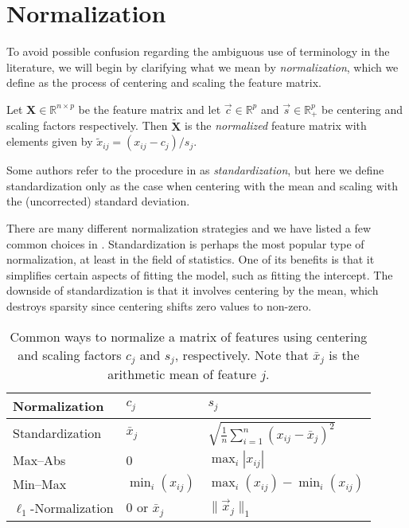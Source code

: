 \section{Normalization}
To avoid possible confusion regarding the ambiguous use of terminology in the literature,
we will begin by clarifying what we mean by \emph{normalization}, which we define as the
process of centering and scaling the feature matrix.

\begin{definition}[Normalization]
  \label{def:normalization}
  Let \(\bm{X} \in \mathbb{R}^{n\times p}\) be the feature matrix and let
  \(\vec{c} \in \mathbb{R}^p\) and \(\vec{s} \in \mathbb{R}^p_+\) be centering
  and scaling factors respectively. Then \(\tilde{\bm{X}}\) is the
  \emph{normalized} feature matrix with elements given by
  \(\tilde{x}_{ij} = (x_{ij} - c_j)/s_j\).
\end{definition}

Some authors refer to the procedure in  as \emph{standardization},
but here we define standardization only as the case when centering with the mean and
scaling with the (uncorrected) standard deviation.

There are many different normalization strategies and we have listed a few common choices
in . Standardization is perhaps the most popular type of
normalization, at least in the field of statistics. One of its benefits is that it
simplifies certain aspects of fitting the model, such as fitting the intercept. The
downside of standardization is that it involves centering by the mean, which destroys
sparsity since centering shifts zero values to non-zero.

\begin{table}[hbtp]
  \centering
  \caption{
    Common ways to normalize a matrix of features using centering and scaling
    factors \(c_j\) and \(s_j\), respectively. Note that \(\bar{x}_j\) is
    the arithmetic mean of feature \(j\).
  }
  \label{tab:normalization-types}
  \begin{tabular}{lll}
    \toprule
    Normalization            & \(c_{j}\)          & \(s_j\)                                                   \\
    \midrule
    Standardization          & \(\bar{x}_j\)      & \(\sqrt{\frac{1}{n}\sum_{i=1}^n (x_{ij} - \bar{x}_j)^2}\) \\
    \addlinespace
    Max--Abs                 & 0                  & \(\max_i|x_{ij}|\)                                        \\
    \addlinespace
    Min--Max                 & \(\min_i(x_{ij})\) & \(\max_i(x_{ij}) - \min_i(x_{ij})\)                       \\
    \addlinespace
    \(\ell_1\)-Normalization & 0 or \(\bar{x}_j\) & \(\lVert \vec{x}_j\rVert_1\)                              \\
    \bottomrule
  \end{tabular}
\end{table}

